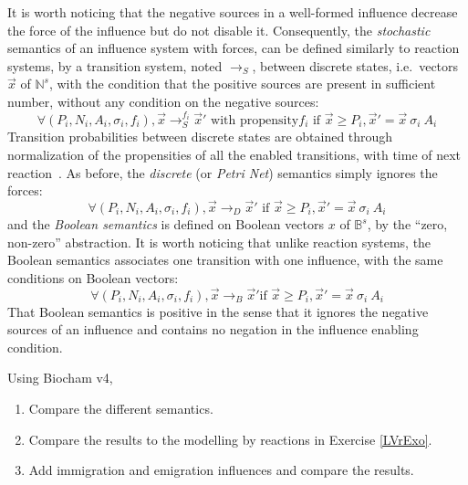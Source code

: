 \documentclass[graybox]{svmult}
\newcommand{\lra}{\longrightarrow}
\begin{document}
It is worth noticing that the negative sources in a well-formed influence
decrease the force of the influence but do not disable it.
Consequently, the \emph{stochastic} semantics of an influence system with forces,
can be defined similarly to reaction systems, by a transition system, noted $\lra_S$, between discrete states, i.e.~vectors $\vec x$ of $\mathbb{N}^s$,
with the condition that the positive sources are present in sufficient number,
without any condition on the negative sources:
      $$\forall (P_i, N_i, A_i, \sigma_i, f_i), {\vec x}\lra_S^{f_i}{\vec x'} \text{ with propensity}f_i\text{ if } {\vec x}\geq P_i, {\vec x'} = {\vec x}\  \sigma_i\ A_i$$
Transition probabilities between discrete states are obtained through
normalization of the propensities of all the enabled transitions,
with time of next reaction~\cite{Gillespie77jpc}.
      As before, the \emph{discrete} (or \emph{Petri Net}) semantics simply ignores the forces:
      $$\forall (P_i, N_i, A_i, \sigma_i, f_i), {\vec x}\lra_D{\vec x'}\text{ if }      {\vec x}\geq P_i, {\vec x'} = {\vec x}\ \sigma_i\ A_i$$
and the \emph{Boolean semantics} is defined on Boolean vectors $x$ of $\mathbb{B}^s$,
by the ``zero, non-zero'' abstraction.
It is worth noticing that unlike reaction systems, the Boolean semantics associates one transition with one influence,
with the same conditions on Boolean vectors:
$$\forall (P_i, N_i, A_i, \sigma_i, f_i), {\vec       x}\lra_B{\vec x'}\text{
if }{\vec x}\geq P_i, {\vec x'} =       {\vec x}\ \sigma_i\ A_i$$
That Boolean semantics is positive in the sense that it ignores the negative sources of an influence
and contains no negation in the influence enabling condition.

\begin{exercise}\label{LViExo} Using Biocham v4,
  \begin{enumerate}
  \item Compare the different semantics.
    \item Compare the results to the modelling by reactions in Exercise \ref{LVrExo}.
  \item Add immigration and emigration influences and compare the results.
    \end{enumerate}
\end{exercise}
\end{document}
